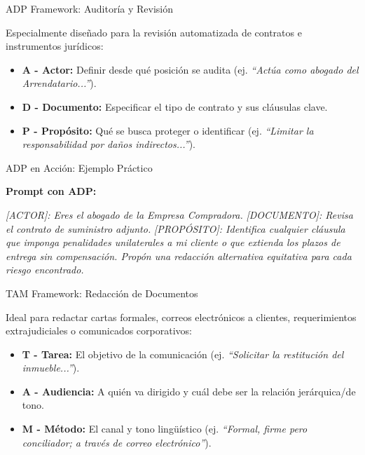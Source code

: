 \documentclass[aspectratio=169]{beamer}
\begin{document}
\begin{frame}[fragile]{ADP Framework: Auditoría y Revisión}


Especialmente diseñado para la revisión automatizada de contratos e instrumentos jurídicos:

\begin{itemize}
  \item \textbf{A - Actor:} Definir desde qué posición se audita (ej. \textit{``Actúa como abogado del Arrendatario...''}).
  \item \textbf{D - Documento:} Especificar el tipo de contrato y sus cláusulas clave.
  \item \textbf{P - Propósito:} Qué se busca proteger o identificar (ej. \textit{``Limitar la responsabilidad por daños indirectos...''}).
\end{itemize}
\end{frame}



\begin{frame}[fragile]{ADP en Acción: Ejemplo Práctico}


\textbf{Prompt con ADP:}

\textit{[ACTOR]: Eres el abogado de la Empresa Compradora.}
\textit{[DOCUMENTO]: Revisa el contrato de suministro adjunto.}
\textit{[PROPÓSITO]: Identifica cualquier cláusula que imponga penalidades unilaterales a mi cliente o que extienda los plazos de entrega sin compensación. Propón una redacción alternativa equitativa para cada riesgo encontrado.}

\end{frame}



\begin{frame}[fragile]{TAM Framework: Redacción de Documentos}


Ideal para redactar cartas formales, correos electrónicos a clientes, requerimientos extrajudiciales o comunicados corporativos:

\begin{itemize}
  \item \textbf{T - Tarea:} El objetivo de la comunicación (ej. \textit{``Solicitar la restitución del inmueble...''}).
  \item \textbf{A - Audiencia:} A quién va dirigido y cuál debe ser la relación jerárquica/de tono.
  \item \textbf{M - Método:} El canal y tono lingüístico (ej. \textit{``Formal, firme pero conciliador; a través de correo electrónico''}).
\end{itemize}
\end{frame}
\end{document}
